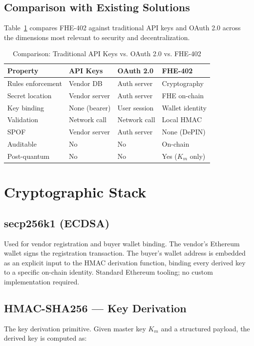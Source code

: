 \documentclass[conference]{IEEEtran}
\begin{document}
\subsection{Comparison with Existing Solutions}

Table~\ref{tab:comparison} compares FHE-402 against traditional API keys and OAuth 2.0
across the dimensions most relevant to security and decentralization.

\begin{table}[h]
\caption{Comparison: Traditional API Keys vs. OAuth 2.0 vs. FHE-402}
\label{tab:comparison}
\renewcommand{\arraystretch}{1.2}
\begin{tabular}{p{1.6cm}p{1.7cm}p{1.7cm}p{1.9cm}}
\toprule
\textbf{Property} & \textbf{API Keys} & \textbf{OAuth 2.0} & \textbf{FHE-402} \\
\midrule
Rules enforcement & Vendor DB & Auth server & Cryptography \\
Secret location & Vendor server & Auth server & FHE on-chain \\
Key binding & None (bearer) & User session & Wallet identity \\
Validation & Network call & Network call & Local HMAC \\
SPOF & Vendor server & Auth server & None (DePIN) \\
Auditable & No & No & On-chain \\
Post-quantum & No & No & Yes ($K_m$ only) \\
\bottomrule
\end{tabular}
\end{table}

\section{Cryptographic Stack}
\label{sec:crypto}

\subsection{secp256k1 (ECDSA)}
Used for vendor registration and buyer wallet binding. The vendor's Ethereum wallet
signs the registration transaction. The buyer's wallet address is embedded as an explicit
input to the HMAC derivation function, binding every derived key to a specific on-chain
identity. Standard Ethereum tooling; no custom implementation required.

\subsection{HMAC-SHA256 --- Key Derivation}
The key derivation primitive. Given master key $K_m$ and a structured payload, the
derived key is computed as:
\end{document}
